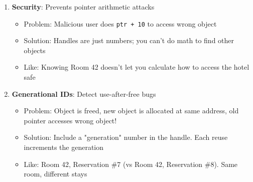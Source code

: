 \begin{enumerate}
    \item \textbf{Security}: Prevents pointer arithmetic attacks
    \begin{itemize}
        \item Problem: Malicious user does \texttt{ptr + 10} to access wrong object
        \item Solution: Handles are just numbers; you can't do math to find other objects
        \item Like: Knowing Room 42 doesn't let you calculate how to access the hotel safe
    \end{itemize}

    \item \textbf{Generational IDs}: Detect use-after-free bugs
    \begin{itemize}
        \item Problem: Object is freed, new object is allocated at same address, old pointer accesses wrong object!
        \item Solution: Include a "generation" number in the handle. Each reuse increments the generation
        \item Like: Room 42, Reservation \#7 (vs Room 42, Reservation \#8). Same room, different stays
    \end{itemize}
\end{enumerate}

